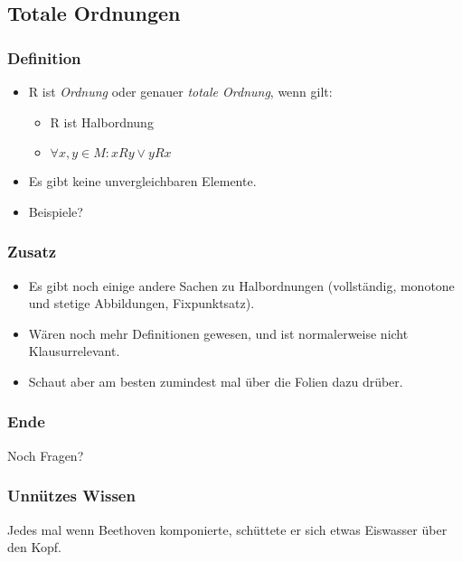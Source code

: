 \documentclass{beamer}
\begin{document}
\subsection{Totale Ordnungen}
\begin{frame}
	\frametitle{Definition}
	\begin{itemize}
		\item R ist \textit{Ordnung} oder genauer \textit{totale Ordnung}, wenn gilt:
		\begin{itemize}
			\item R ist Halbordnung
			\item $\forall x,y \in M : xRy \lor yRx$		
		\end{itemize}
		\pause
		\item Es gibt keine unvergleichbaren Elemente.
		\item Beispiele?
	\end{itemize}
\end{frame}

\begin{frame}
	\frametitle{Zusatz}
	\begin{itemize}
		\item Es gibt noch einige andere Sachen zu Halbordnungen (vollständig, monotone und stetige Abbildungen, Fixpunktsatz).
		\item Wären noch mehr Definitionen gewesen, und ist normalerweise nicht Klausurrelevant.
		\item Schaut aber am besten zumindest mal über die Folien dazu drüber.
	\end{itemize}
\end{frame}

\begin {frame}
\frametitle {Ende}
	\begin {center}
		Noch Fragen?
	\end {center}
\end {frame}

\begin {frame}
\frametitle {Unnützes Wissen}
	\begin {center}
		Jedes mal wenn Beethoven komponierte, schüttete er sich etwas Eiswasser über den Kopf.
	\end {center}
\end {frame}
\end{document}
